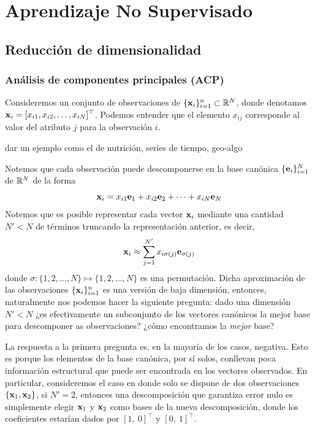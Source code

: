 
\section{Aprendizaje No Supervisado}

\subsection{Reducción de dimensionalidad}
\subsubsection{Análisis de componentes principales (ACP)}

Consideremos un conjunto de observaciones de $\{\mathbf{x}_i\}_{i=1}^n\subset{\mathbb R}^N$, donde denotamos $\mathbf{x}_i=[x_{i1},x_{i2},\ldots,x_{iN}]^\top$. Podemos entender que el elemento $x_{ij}$ corresponde al valor del atributo $j$ para la observación $i$. 

\begin{mdframed}[style=pendiente, frametitle={\center ejemplos}]
dar un ejemplo como el de nutrición, series de tiempo, geo-algo
\end{mdframed}

Notemos que cada observación puede descomponerse en la base canónica $\{\mathbf{e}_i\}_{i=1}^N$ de ${\mathbb R}^N$ de la forma 
\begin{equation}
	\mathbf{x}_i = x_{i1}\mathbf{e}_1 +  x_{i2}\mathbf{e}_2 + \cdots + x_{iN}\mathbf{e}_N 		
\end{equation}
Notemos que es posible representar cada vector $\mathbf{x}_i$ mediante una cantidad $N'<N$ de términos truncando la representación anterior, es decir,  
\begin{equation}
	\mathbf{x}_i \approx \sum_{j=1}^{N'} x_{i\sigma(j)}\mathbf{e}_{\sigma(j)}
\end{equation}
donde $\sigma:\{1,2,\ldots,N\}\mapsto\{1,2,\ldots,N\}$ es una permutación. Dicha aproximación de las observaciones $\{\mathbf{x}_i\}_{i=1}^n$ es una versión de baja dimensión, entonces, naturalmente nos podemos hacer la siguiente pregunta: dado una dimensión $N'<N$  ¿es efectivamente un subconjunto de los vectores canónicos la mejor base para descomponer as observaciones?  ¿cómo encontramos la \emph{mejor} base?

La respuesta a la primera pregunta es, en la mayoría de los casos, negativa. Esto es porque los elementos de la base canónica, por sí solos, conllevan poca información estructural que puede ser encontrada en los vectores observados. En particular, consideremos el caso en donde solo se dispone de dos observaciones $\{\mathbf{x}_1, \mathbf{x}_2\}$, si $N'=2$, entonces una descomposición que garantiza error nulo es simplemente elegir $\mathbf{x}_1$ y $\mathbf{x}_2$ como bases de la nueva descomposición, donde los coeficientes estarían dados por $[1,\ 0]^\top$ y $[0,\ 1]^\top$. 

